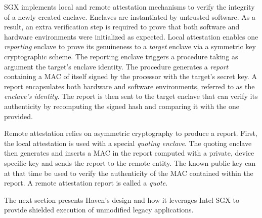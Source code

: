 SGX implements local and remote attestation mechanisms to verify the integrity of a newly created enclave.
Enclaves are instantiated by untrusted software.
As a result, an extra verification step is required to prove that both software and hardware environments were initialized as expected.
Local attestation enables one \emph{reporting} enclave to prove its genuineness to a \emph{target} enclave via a symmetric key cryptographic scheme.
The reporting enclave triggers a procedure taking as argument the target's enclave identity.
The procedure generates a \emph{report} containing a MAC of itself signed by the processor with the target's secret key.
A report encapsulates both hardware and software environments, referred to as the \emph{enclave's identity}.
The report is then sent to the target enclave that can verify its authenticity by recomputing the signed hash and comparing it with the one provided.

Remote attestation relies on asymmetric cryptography to produce a report.
First, the local attestation is used with a special \emph{quoting enclave}.
The quoting enclave then generates and inserts a MAC in the report computed with a private, device specific key and sends the report to the remote entity.
The known public key can at that time be used to verify the authenticity of the MAC contained within the report.
A remote attestation report is called a \emph{quote}.

The next section presents Haven's design and how it leverages Intel SGX to provide shielded execution of unmodified legacy applications.